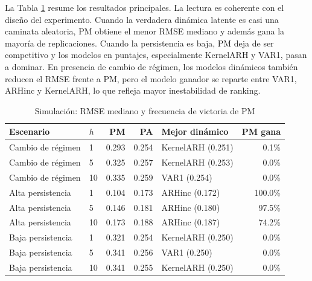 \documentclass[a4paper,11pt]{article}
\begin{document}
La Tabla \ref{tab:sim_summary} resume los resultados principales. La lectura es coherente con el diseño del experimento. Cuando la verdadera dinámica latente es casi una caminata aleatoria, PM obtiene el menor RMSE mediano y además gana la mayoría de replicaciones. Cuando la persistencia es baja, PM deja de ser competitivo y los modelos en puntajes, especialmente KernelARH y VAR1, pasan a dominar. En presencia de cambio de régimen, los modelos dinámicos también reducen el RMSE frente a PM, pero el modelo ganador se reparte entre VAR1, ARHinc y KernelARH, lo que refleja mayor inestabilidad de ranking.

\begin{table}[H]
\centering
\caption{Simulación: RMSE mediano y frecuencia de victoria de PM}
\label{tab:sim_summary}
\scriptsize
\begin{tabular}{llrrlr}
\toprule
Escenario & \(h\) & PM & PA & Mejor dinámico & PM gana \\
\midrule
Cambio de régimen & 1 & 0.293 & 0.254 & KernelARH (0.251) & 0.1\% \\
Cambio de régimen & 5 & 0.325 & 0.257 & KernelARH (0.253) & 0.0\% \\
Cambio de régimen & 10 & 0.335 & 0.259 & VAR1 (0.254) & 0.0\% \\
Alta persistencia & 1 & 0.104 & 0.173 & ARHinc (0.172) & 100.0\% \\
Alta persistencia & 5 & 0.146 & 0.181 & ARHinc (0.180) & 97.5\% \\
Alta persistencia & 10 & 0.173 & 0.188 & ARHinc (0.187) & 74.2\% \\
Baja persistencia & 1 & 0.321 & 0.254 & KernelARH (0.250) & 0.0\% \\
Baja persistencia & 5 & 0.341 & 0.256 & VAR1 (0.250) & 0.0\% \\
Baja persistencia & 10 & 0.341 & 0.255 & KernelARH (0.250) & 0.0\% \\
\bottomrule
\end{tabular}
\end{table}
\end{document}
